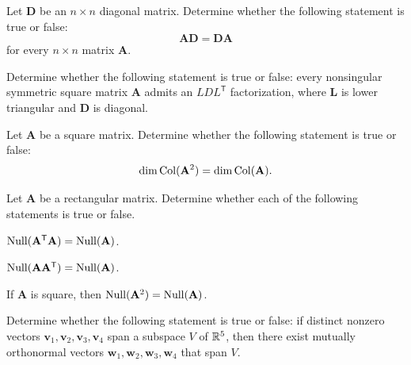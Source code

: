 \documentclass[11pt,oneside]{article}
\begin{document}
\begin{problem}
Let $\mathbf D$ be an $n\times n$ diagonal matrix. Determine whether the following statement is true or false:
\[
\mathbf A\mathbf D=\mathbf D\mathbf A
\]
for every $n\times n$ matrix $\mathbf A$.
\end{problem}

\begin{problem}
Determine whether the following statement is true or false: every nonsingular symmetric square matrix $\mathbf A$ admits an $LDL^{\mathsf T}$ factorization, where $\mathbf L$ is lower triangular and $\mathbf D$ is diagonal.
\end{problem}

\begin{problem}
Let $\mathbf A$ be a square matrix. Determine whether the following statement is true or false:
\[
\dim\operatorname{Col}(\mathbf A^2)=\dim\operatorname{Col}(\mathbf A).
\]
\end{problem}

\begin{problem}
Let $\mathbf A$ be a rectangular matrix. Determine whether each of the following statements is true or false.
\begin{problemchoices}
\item $\operatorname{Null}(\mathbf A^{\mathsf T}\mathbf A)=\operatorname{Null}(\mathbf A)$.
\item $\operatorname{Null}(\mathbf A\mathbf A^{\mathsf T})=\operatorname{Null}(\mathbf A)$.
\item If $\mathbf A$ is square, then $\operatorname{Null}(\mathbf A^2)=\operatorname{Null}(\mathbf A)$.
\end{problemchoices}
\end{problem}

\begin{problem}
Determine whether the following statement is true or false: if distinct nonzero vectors $\mathbf v_1,\mathbf v_2,\mathbf v_3,\mathbf v_4$ span a subspace $V$ of $\mathbb{R}^5$, then there exist mutually orthonormal vectors $\mathbf w_1,\mathbf w_2,\mathbf w_3,\mathbf w_4$ that span $V$.
\end{problem}
\end{document}
